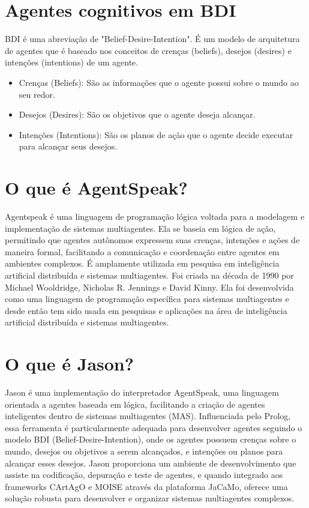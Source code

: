 \documentclass[12pt]{article}
\begin{document}
	\section{Agentes cognitivos em BDI}
	\label{sec:agentes_cog}

    BDI é uma abreviação de "Belief-Desire-Intention". É um modelo de arquitetura de agentes que é baseado nos conceitos de crenças (beliefs), desejos (desires) e intenções (intentions) de um agente.
    \begin{itemize}
    \item Crenças (Beliefs): São as informações que o agente possui sobre o mundo ao seu redor.
    \item Desejos (Desires): São os objetivos que o agente deseja alcançar.
    \item Intenções (Intentions): São os planos de ação que o agente decide executar para alcançar seus desejos.
    \end{itemize}

    \section{O que é AgentSpeak?}
	\label{sec:sis_multiagente}

    Agentspeak é uma linguagem de programação lógica voltada para a modelagem e implementação de sistemas multiagentes. Ela se baseia em lógica de ação, permitindo que agentes autônomos expressem suas crenças, intenções e ações de maneira formal, facilitando a comunicação e coordenação entre agentes em ambientes complexos. É amplamente utilizada em pesquisa em inteligência artificial distribuída e sistemas multiagentes. Foi criada na década de 1990 por Michael Wooldridge, Nicholas R. Jennings e David Kinny. Ela foi desenvolvida como uma linguagem de programação específica para sistemas multiagentes e desde então tem sido usada em pesquisas e aplicações na área de inteligência artificial distribuída e sistemas multiagentes.

    \section{O que é Jason?}
	\label{sec:sis_multiagente}

    Jason é uma implementação do interpretador AgentSpeak, uma linguagem orientada a agentes baseada em lógica, facilitando a criação de agentes inteligentes dentro de sistemas multiagentes (MAS). Influenciada pelo Prolog, essa ferramenta é particularmente adequada para desenvolver agentes seguindo o modelo BDI (Belief-Desire-Intention), onde os agentes possuem crenças sobre o mundo, desejos ou objetivos a serem alcançados, e intenções ou planos para alcançar esses desejos. Jason proporciona um ambiente de desenvolvimento que assiste na codificação, depuração e teste de agentes, e quando integrado aos frameworks CArtAgO e MOISE através da plataforma JaCaMo, oferece uma solução robusta para desenvolver e organizar sistemas multiagentes complexos.
    
\end{document}
